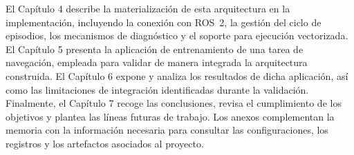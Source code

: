 El Capítulo 4 describe la materialización de esta arquitectura en la
implementación, incluyendo la conexión con ROS~2, la gestión del ciclo de
episodios, los mecanismos de diagnóstico y el soporte para ejecución
vectorizada. El Capítulo 5 presenta la aplicación de entrenamiento de una tarea
de navegación, empleada para validar de manera integrada la arquitectura construida.
El Capítulo 6 expone y analiza los resultados de dicha aplicación, así como las
limitaciones de integración identificadas durante la validación. Finalmente, el
Capítulo 7 recoge las conclusiones, revisa el cumplimiento de los objetivos y
plantea las líneas futuras de trabajo. Los anexos complementan la memoria con la
información necesaria para consultar las configuraciones, los registros y los
artefactos asociados al proyecto.


